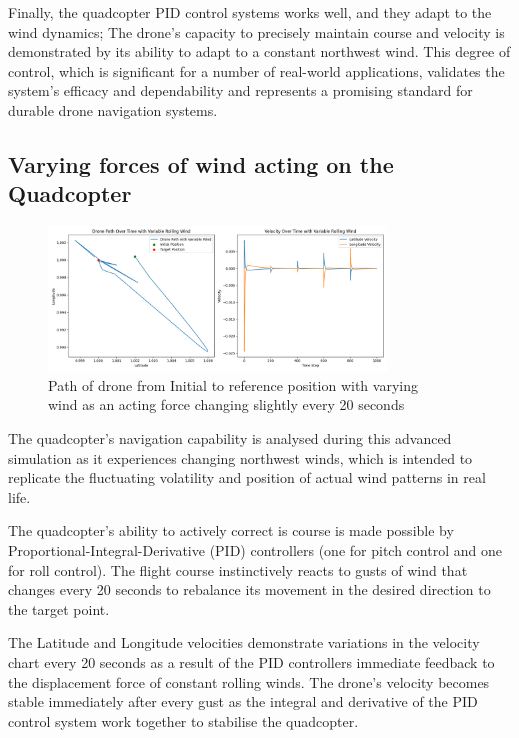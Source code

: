 \documentclass{article}
\begin{document}
Finally, the quadcopter PID control systems works well, and they adapt to the
wind dynamics; The drone's capacity to precisely maintain course and velocity is
demonstrated by its ability to adapt to a constant northwest wind. This degree
of control, which is significant for a number of real-world applications,
validates the system's efficacy and dependability and represents a promising
standard for durable drone navigation systems.


\subsection*{Varying forces of wind acting on the Quadcopter}
\begin{figure}[H]
  \centering
  \includegraphics[width=0.8\textwidth]{Pictures/Drone_path_wind_varys.png} 
  \captionsetup{justification=centering}
  \caption{Path of drone from Initial to reference position with varying\\ wind as an acting force changing slightly every 20 seconds}
  \label{fig:Drone_path_wind_varys}
\end{figure}
The quadcopter’s navigation capability is analysed during this advanced
simulation as it experiences changing northwest winds, which is intended to
replicate the fluctuating volatility and position of actual wind patterns in
real life. 

The quadcopter’s ability to actively correct is course is made possible by
Proportional-Integral-Derivative (PID) controllers (one for pitch control and
one for roll control). The flight course instinctively reacts to gusts of wind
that changes every 20 seconds to rebalance its movement in the desired direction
to the target point. 

The Latitude and Longitude velocities demonstrate variations in the velocity
chart every 20 seconds as a result of the  PID controllers immediate feedback to
the displacement force of constant rolling winds. The drone’s velocity becomes
stable immediately after every gust as the integral and derivative of the PID
control system work together to stabilise the quadcopter.
\end{document}
